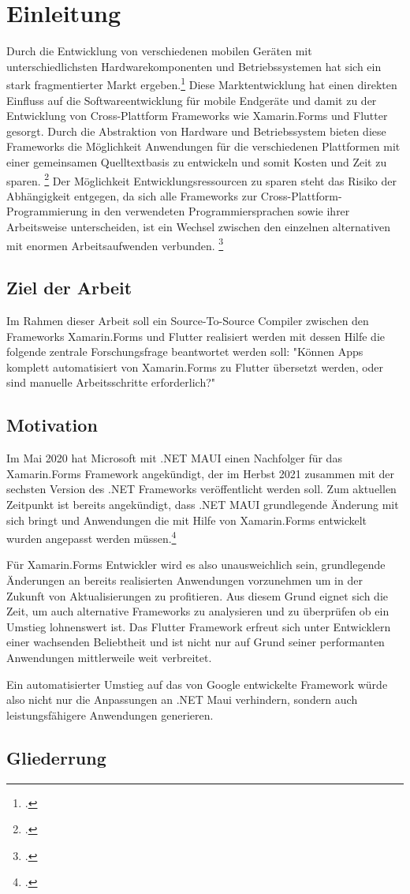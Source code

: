 \chapter{Einleitung}
Durch die Entwicklung von verschiedenen mobilen Geräten mit unterschiedlichsten Hardwarekomponenten und Betriebssystemen hat sich ein stark fragmentierter Markt ergeben.\footcite[Vgl.][S. 3]{Joorabchi2016}  Diese Marktentwicklung hat einen direkten Einfluss auf die Softwareentwicklung für mobile Endgeräte und damit zu der Entwicklung von Cross-Plattform Frameworks wie Xamarin.Forms und Flutter gesorgt. Durch die Abstraktion von Hardware und Betriebssystem bieten diese Frameworks die Möglichkeit Anwendungen für die verschiedenen Plattformen mit einer gemeinsamen Quelltextbasis zu entwickeln und somit Kosten und Zeit zu sparen. \footcite[Vgl.][S. 295]{Vollmer2017} 
Der Möglichkeit Entwicklungsressourcen zu sparen steht das Risiko der Abhängigkeit entgegen, da sich alle Frameworks zur Cross-Plattform-Programmierung in den verwendeten Programmiersprachen sowie ihrer Arbeitsweise unterscheiden, ist ein Wechsel zwischen den einzelnen alternativen mit enormen Arbeitsaufwenden verbunden. \footcite[Vgl.][S. 64]{Wissel2017}  
\section{Ziel der Arbeit}
Im Rahmen dieser Arbeit soll ein Source-To-Source Compiler zwischen den Frameworks Xamarin.Forms und Flutter realisiert werden mit dessen Hilfe die folgende zentrale Forschungsfrage beantwortet werden soll: "Können Apps komplett automatisiert von Xamarin.Forms zu Flutter übersetzt werden, oder sind manuelle Arbeitsschritte erforderlich?"
\section{Motivation}
Im Mai 2020 hat Microsoft mit .NET MAUI einen Nachfolger für das Xamarin.Forms Framework angekündigt, der im Herbst 2021 zusammen mit der sechsten Version des .NET Frameworks veröffentlicht werden soll. Zum aktuellen Zeitpunkt ist bereits angekündigt, dass .NET MAUI grundlegende Änderung mit sich bringt und Anwendungen die mit Hilfe von Xamarin.Forms entwickelt wurden angepasst werden müssen.\footcite[Vgl.][Abgerufen am 28.10.2020]{Hunter2020}

Für Xamarin.Forms Entwickler wird es also unausweichlich sein, grundlegende Änderungen an bereits realisierten Anwendungen vorzunehmen um in der Zukunft von Aktualisierungen zu profitieren. Aus diesem Grund eignet sich die Zeit, um auch alternative Frameworks zu analysieren und zu überprüfen ob ein  Umstieg lohnenswert ist. Das Flutter Framework erfreut sich unter Entwicklern einer wachsenden Beliebtheit und ist nicht nur auf Grund seiner performanten Anwendungen mittlerweile weit verbreitet. 

Ein automatisierter Umstieg auf das von Google entwickelte Framework würde also nicht nur die Anpassungen an .NET Maui verhindern, sondern auch leistungsfähigere Anwendungen generieren. 

\section{Gliederrung}
